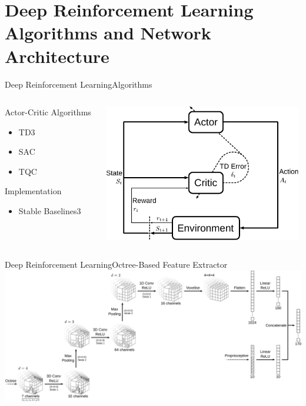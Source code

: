 \section{Deep Reinforcement Learning Algorithms and Network Architecture}

\begin{frame}{Deep Reinforcement Learning}{Algorithms}
    \begin{columns}%
        \begin{column}{0.3\textwidth}%
            \begin{block}{Actor-Critic Algorithms}
                \begin{itemize}
                    \item TD3
                    \item SAC
                    \item TQC
                \end{itemize}
            \end{block}
            \begin{block}{Implementation}
                \begin{itemize}
                    \item Stable Baselines3
                \end{itemize}
            \end{block}
        \end{column}
        \begin{column}{0.7\textwidth}%
            \centering
            \includegraphics[height=6cm]{graphics/actor_critic_loop.pdf}
        \end{column}
    \end{columns}
\end{frame}

\begin{frame}{Deep Reinforcement Learning}{Octree-Based Feature Extractor}
    \centering
    \includegraphics[width=\textwidth]{graphics/feature_extractor.pdf}
\end{frame}

